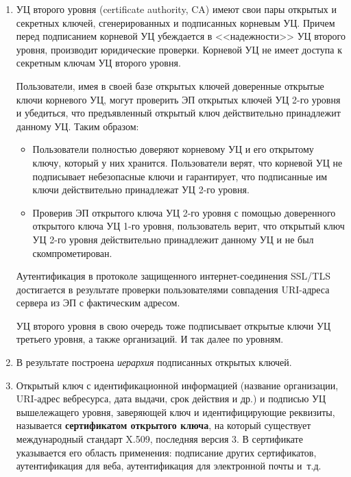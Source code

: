 \begin{enumerate}
    \item УЦ второго уровня (certificate authority, CA) имеют свои пары открытых и секретных ключей, сгенерированных и подписанных корневым УЦ. Причем перед подписанием корневой УЦ убеждается в <<надежности>> УЦ второго уровня, производит юридические проверки. Корневой УЦ не имеет доступа к секретным ключам УЦ второго уровня.

        Пользователи, имея в своей базе открытых ключей доверенные открытые ключи корневого УЦ, могут проверить ЭП открытых ключей УЦ 2-го уровня и убедиться, что предъявленный открытый ключ действительно принадлежит данному УЦ. Таким образом:
        \begin{itemize}
            \item Пользователи полностью доверяют корневому УЦ и его открытому ключу, который у них хранится. Пользователи верят, что корневой УЦ не подписывает небезопасные ключи и гарантирует, что подписанные им ключи действительно принадлежат УЦ 2-го уровня.
            \item Проверив ЭП открытого ключа УЦ 2-го уровня с помощью доверенного открытого ключа УЦ 1-го уровня, пользователь верит, что открытый ключ УЦ  2-го уровня действительно принадлежит данному УЦ и не был скомпрометирован.
        \end{itemize}

        Аутентификация в протоколе защищенного интернет-соединения SSL/TLS достигается в результате  проверки пользователями совпадения URI-адреса сервера из ЭП с фактическим адресом.

        УЦ второго уровня в свою очередь тоже подписывает открытые ключи УЦ третьего уровня, а также организаций.  И так далее по уровням.

    \item В результате построена \emph{иерархия} подписанных открытых ключей.

    \item Открытый ключ с идентификационной информацией (название организации, URI-адрес вебресурса, дата выдачи, срок действия и др.) и подписью УЦ вышележащего уровня, заверяющей ключ и идентифицирующие реквизиты, называется \textbf{сертификатом открытого ключа}, на который существует международный стандарт X.509, последняя версия 3. В сертификате указывается его область применения: подписание других сертификатов, аутентификация для веба, аутентификация для электронной почты и~т.д.
\end{enumerate}



